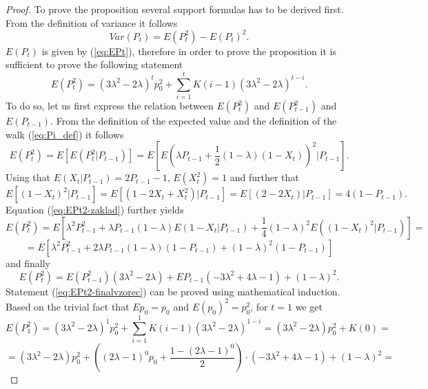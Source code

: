 \documentclass{amsart}
\theoremstyle{definition}
\theoremstyle{plain}
\theoremstyle{plain}
\theoremstyle{plain}
\numberwithin{equation}{section}
\begin{document}
    \begin{proof}
        To prove the proposition several support formulas has to be derived
        first. From the definition of variance it follows
        \begin{equation}
            Var(P_{t})=E(P_{t}^{2})-E(P_{t})^{2}.\label{eq:VarP-definition}
        \end{equation}
        $E(P_{t})$ is given by (\ref{eq:EPt}), therefore in order to prove
        the proposition it is sufficient to prove the following statement
        \begin{equation}
            E(P_{t}^{2})=(3\lambda^{2}-2\lambda)^{t}p_{0}^{2}+\sum_{i=1}^{t}K(i-1)(3\lambda^{2}-2\lambda)^{t-i}.\label{eq:EPt2-finalvzorec}
        \end{equation}
        To do so, let us first express the relation between $E(P_{t}^{2})$
        and $E(P_{t-1}^{2})$ and $E(P_{t-1}).$ From the definition of the
        expected value and the definition of the walk (\ref{eq:Pi_def}) it follows
        \begin{equation}
            E(P_{t}^{2})=E[E(P_{t}^{2}|P_{t-1})]=E[E(\lambda P_{t-1}+\frac{1}{2}(1-\lambda)(1-X_{t}))^{2}|P_{t-1}].\label{eq:EPt2-zaklad}
        \end{equation}
        Using that $E(X_{t}|P_{t-1})=2P_{t-1}-1$, $E(X_{t}^{2})=1$ and further
        that
        \[
            E[(1-X_{t})^{2}|P_{t-1}]=E[(1-2X_{t}+X_{t}^{2})|P_{t-1}]
            =E[(2-2X_{t})|P_{t-1}]= 4(1-P_{t-1}).
        \]
        Equation (\ref{eq:EPt2-zaklad}) further yields
        \[
            E(P_{t}^{2})=E[\lambda^{2}P_{t-1}^{2}+\lambda P_{t-1}(1-\lambda)E(1-X_{t}|P_{t-1})+\frac{1}{4}(1-\lambda)^{2}E((1-X_{t})^{2}|P_{t-1})]=
        \]
        \[
            =E[\lambda^{2}P_{t-1}^{2}+2\lambda P_{t-1}(1-\lambda)(1-P_{t-1})+(1-\lambda)^{2}(1-P_{t-1})]
        \]
        and finally
        \begin{equation}
            E(P_{t}^{2})=E(P_{t-1}^{2})(3\lambda^{2}-2\lambda)+EP_{t-1}(-3\lambda^{2}+4\lambda-1)+(1-\lambda)^{2}.\label{eq:EPt2-pokrocile}
        \end{equation}
        Statement (\ref{eq:EPt2-finalvzorec}) can be proved using mathematical induction.
        Based on the trivial fact that $Ep_{0}=p_{0}$ and $E(p_{0})^{2}=p_{0}^{2}$,
        for $t=1$ we get
        \[
            E(P_{1}^{2})=(3\lambda^{2}-2\lambda)^{1}p_{0}^{2}+\sum_{i=1}^{1}K(i-1)(3\lambda^{2}-2\lambda)^{1-i}=(3\lambda^{2}-2\lambda)p_{0}^{2}+K(0)=
        \]
        \[
            =(3\lambda^{2}-2\lambda)p_{0}^{2}+((2\lambda-1)^{0}p_{0}+\frac{1-(2\lambda-1)^{0}}{2})\cdot(-3\lambda^{2}+4\lambda-1)+(1-\lambda)^{2}=
\]
\end{proof}
\end{document}
